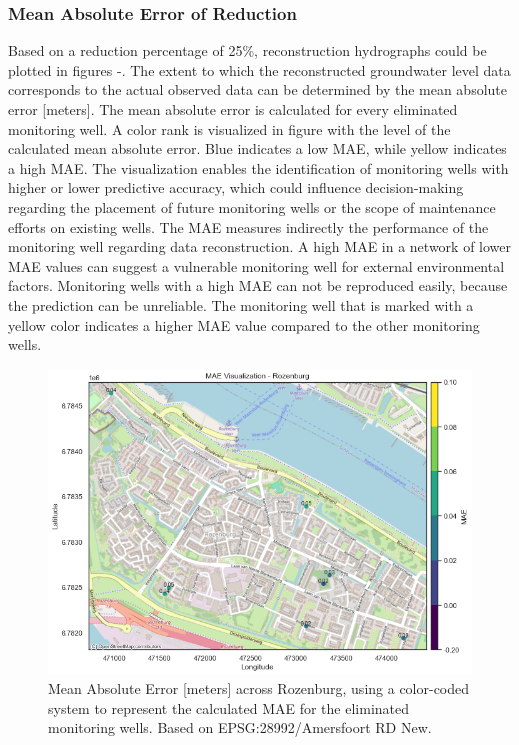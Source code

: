 \subsubsection{Mean Absolute Error of Reduction}
Based on a reduction percentage of 25\%, reconstruction hydrographs could be plotted in figures -. The extent to which the reconstructed groundwater level data corresponds to the actual observed data can be determined by the mean absolute error [meters]. The mean absolute error is calculated for every eliminated monitoring well. A color rank is visualized in figure  with the level of the calculated mean absolute error. Blue indicates a low MAE, while yellow indicates a high MAE. The visualization enables the identification of monitoring wells with higher or lower predictive accuracy, which could influence decision-making regarding the placement of future monitoring wells or the scope of maintenance efforts on existing wells. The MAE measures indirectly the performance of the monitoring well regarding data reconstruction. A high MAE in a network of lower MAE values can suggest a vulnerable monitoring well for external environmental factors. Monitoring wells with a high MAE can not be reproduced easily, because the prediction can be unreliable. The monitoring well that is marked with a yellow color indicates a higher MAE value compared to the other monitoring wells. 
\begin{figure}[htbp]
    \centering
    \includegraphics[width=1\linewidth]{frontmatter/Rozenburg-fig/newmae.png}
    \caption{Mean Absolute Error [meters] across Rozenburg, using a color-coded system to represent the calculated MAE for the eliminated monitoring wells. Based on EPSG:28992/Amersfoort RD New.}
    \label{maeroz}
\end{figure}


